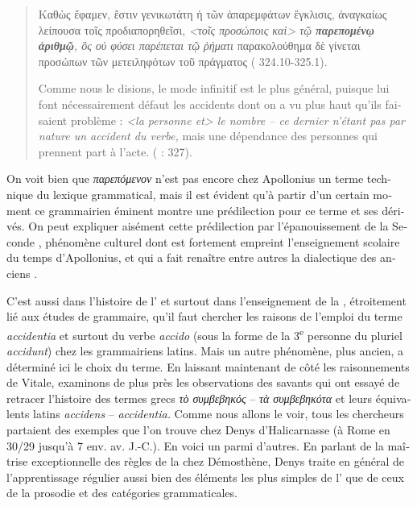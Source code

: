 \documentclass[output=paper]{langsci/langscibook}
\begin{document}
\begin{otherlanguage}{french}
\begin{quote}
    Καθὼς ἔφαμεν, ἔστιν γενικωτάτη ἡ τῶν ἀπαρεμφάτων ἔγκλισις, ἀναγκαίως λείπουσα τοῖς προδιαπορηθεῖσι, \textit{<τοῖς προσώποις καὶ> τῷ {\textbf{{παρεπομένῳ ἀριθμῷ}}, ὃς οὐ φύσει παρέπεται τῷ ῥήματι}} παρακολούθημα δὲ γίνεται προσώπων τῶν μετειληφότων τοῦ πράγματος ( 324.10-325.1).
    
    Comme nous le disions, le mode infinitif est le plus général, puisque lui font nécessairement défaut les accidents dont on a vu plus haut qu’ils faisaient problème : \textit{<la personne et> le nombre – ce dernier n’étant pas par nature un accident du verbe,} mais une dépendance des personnes qui prennent part à l’acte. (\citealt{lallot_apollonius_1997} : 327).

\end{quote}

On voit bien que \textit{παρεπόμενον} n’est pas encore chez Apollonius un terme technique du lexique grammatical, mais il est évident qu’à partir d’un certain moment ce grammairien éminent montre une prédilection pour ce terme et ses dérivés. On peut expliquer aisément cette prédilection par l’épanouissement de la Seconde , phénomène culturel dont est fortement empreint l’enseignement scolaire du temps d’Apollonius, et qui a fait renaître entre autres la dialectique des anciens . 

C’est aussi dans l’histoire de l’ et surtout dans l’enseignement de la , étroitement lié aux études de grammaire, qu’il faut chercher les raisons de l’emploi du terme \textit{accidentia} et surtout du verbe \textit{accido} (sous la forme de la 3\textsuperscript{e} personne du pluriel \textit{accidunt}) chez les grammairiens latins. Mais un autre phénomène, plus ancien, a déterminé ici le choix du terme. En laissant maintenant de côté les raisonnements de Vitale, examinons de plus près les observations des savants qui ont essayé de retracer l’histoire des termes grecs \textit{τὸ συμβεβηκός} – \textit{τὰ συμβεβηκότα} et leurs équivalents latins \textit{accidens} – \textit{accidentia.} Comme nous allons le voir, tous les chercheurs partaient des exemples que l’on trouve chez Denys d’Halicarnasse (à Rome en 30/29 jusqu’à 7 env. av. J.-C.). En voici un parmi d’autres. En parlant de la maîtrise exceptionnelle des règles de la  chez Démosthène, Denys traite en général de l’apprentissage régulier aussi bien des éléments les plus simples de l’ que de ceux de la prosodie et des catégories grammaticales. 


\end{otherlanguage}
\end{document}
